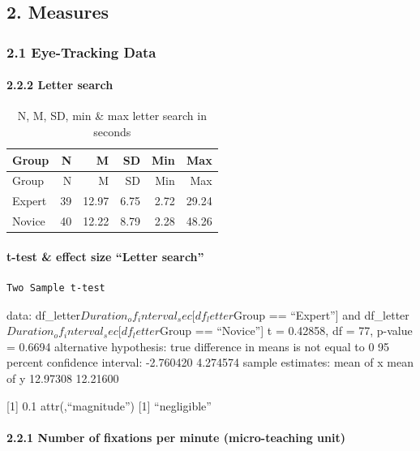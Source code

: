 \documentclass[
]{article}
\begin{document}
\subsection{2. Measures}\label{measures}

\subsubsection{2.1 Eye-Tracking Data}\label{eye-tracking-data}

\paragraph{2.2.2 Letter search}\label{letter-search}

\begin{longtable}[]{@{}lrrrrr@{}}
\caption{N, M, SD, min \& max letter search in seconds}\tabularnewline
\toprule\noalign{}
Group & N & M & SD & Min & Max \\
\midrule\noalign{}
\endfirsthead
\toprule\noalign{}
Group & N & M & SD & Min & Max \\
\midrule\noalign{}
\endhead
\bottomrule\noalign{}
\endlastfoot
Expert & 39 & 12.97 & 6.75 & 2.72 & 29.24 \\
Novice & 40 & 12.22 & 8.79 & 2.28 & 48.26 \\
\end{longtable}

\paragraph{t-test \& effect size ``Letter
search''}\label{t-test-effect-size-letter-search}

\begin{verbatim}
Two Sample t-test
\end{verbatim}

data: df\_letter\(Duration_of_interval_sec[df_letter\)Group ==
``Expert''{]} and df\_letter\(Duration_of_interval_sec[df_letter\)Group
== ``Novice''{]} t = 0.42858, df = 77, p-value = 0.6694 alternative
hypothesis: true difference in means is not equal to 0 95 percent
confidence interval: -2.760420 4.274574 sample estimates: mean of x mean
of y 12.97308 12.21600

{[}1{]} 0.1 attr(,``magnitude'') {[}1{]} ``negligible''

\paragraph{2.2.1 Number of fixations per minute (micro-teaching
unit)}\label{number-of-fixations-per-minute-micro-teaching-unit}
\end{document}
